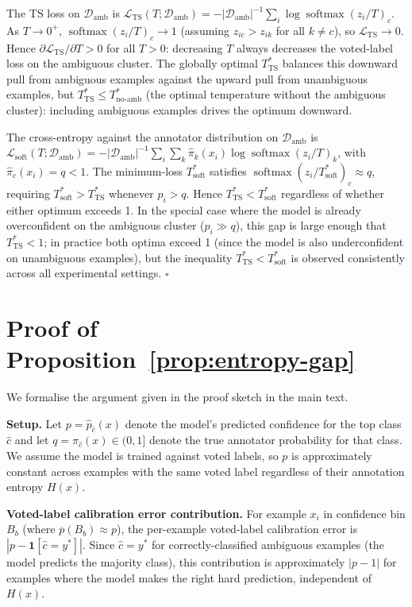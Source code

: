 \documentclass[10pt,journal,compsoc]{IEEEtran}
\newcommand{\phat}{\hat{p}}
\newcommand{\pihat}{\hat{\pi}}
\begin{document}
The TS loss on $\mathcal{D}_\text{amb}$ is $\mathcal{L}_{\text{TS}}(T;\mathcal{D}_\text{amb}) = -|\mathcal{D}_\text{amb}|^{-1}\sum_{i}\log \operatorname{softmax}(z_i/T)_c$.  As $T\to 0^+$, $\operatorname{softmax}(z_i/T)_c\to 1$ (assuming $z_{ic}>z_{ik}$ for all $k\ne c$), so $\mathcal{L}_{\text{TS}}\to 0$.  Hence $\partial\mathcal{L}_{\text{TS}}/\partial T>0$ for all $T>0$: decreasing $T$ always decreases the voted-label loss on the ambiguous cluster.  The globally optimal $T^*_{\text{TS}}$ balances this downward pull from ambiguous examples against the upward pull from unambiguous examples, but $T^*_{\text{TS}}\le T_{\text{no-amb}}^*$ (the optimal temperature without the ambiguous cluster): including ambiguous examples drives the optimum downward.

The cross-entropy against the annotator distribution on $\mathcal{D}_\text{amb}$ is $\mathcal{L}_{\text{soft}}(T;\mathcal{D}_\text{amb}) = -|\mathcal{D}_\text{amb}|^{-1}\sum_i\sum_k\pihat_k(x_i)\log\operatorname{softmax}(z_i/T)_k$, with $\pihat_c(x_i)=q<1$.  The minimum-loss $T^*_{\text{soft}}$ satisfies $\operatorname{softmax}(z_i/T^*_{\text{soft}})_c\approx q$, requiring $T^*_{\text{soft}}>T^*_{\text{TS}}$ whenever $p_i>q$.  Hence $T^*_{\text{TS}} < T^*_{\text{soft}}$ regardless of whether either optimum exceeds 1.  In the special case where the model is already overconfident on the ambiguous cluster ($p_i \gg q$), this gap is large enough that $T^*_{\text{TS}}<1$; in practice both optima exceed 1 (since the model is also underconfident on unambiguous examples), but the inequality $T^*_{\text{TS}} < T^*_{\text{soft}}$ is observed consistently across all experimental settings.  $\square$

\section{Proof of Proposition~\ref{prop:entropy-gap}}
\label{app:proof-entropy}

We formalise the argument given in the proof sketch in the main text.

\noindent\textbf{Setup.}
Let $p=\phat_{\hat{c}}(x)$ denote the model's predicted confidence for the top class $\hat{c}$ and let $q=\pi_{\hat{c}}(x)\in(0,1]$ denote the true annotator probability for that class.  We assume the model is trained against voted labels, so $p$ is approximately constant across examples with the same voted label regardless of their annotation entropy $H(x)$.

\noindent\textbf{Voted-label calibration error contribution.}
For example $x_i$ in confidence bin $B_b$ (where $\overline{p}(B_b)\approx p$), the per-example voted-label calibration error is $|p - \mathbf{1}[\hat{c}=y^*]|$.  Since $\hat{c}=y^*$ for correctly-classified ambiguous examples (the model predicts the majority class), this contribution is approximately $|p-1|$ for examples where the model makes the right hard prediction, independent of $H(x)$.
\end{document}
